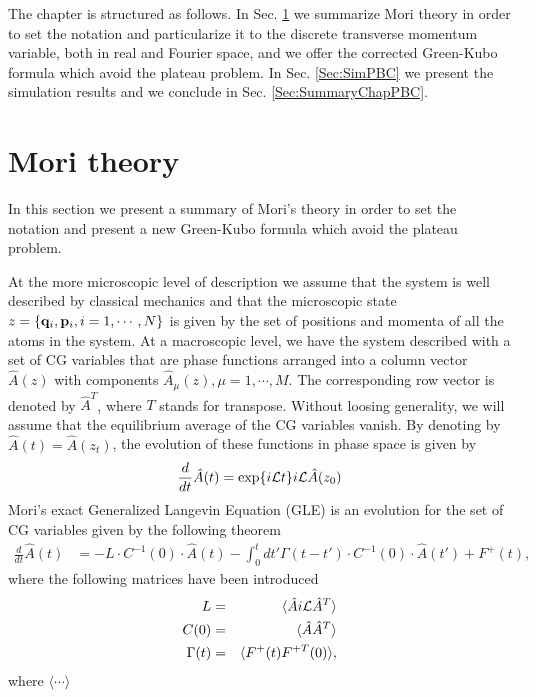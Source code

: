 \documentclass[b5paper,openright,11pt]{book}
\newcommand{\esc}{\!\cdot\!}
\begin{document}
The chapter is structured as follows. In Sec. \ref{Sec:Mori} we summarize
Mori theory in  order to set the notation and  particularize it to the
discrete transverse momentum variable, both in real and Fourier space, and we offer the corrected Green-Kubo formula which avoid the plateau problem.
In Sec. \ref{Sec:SimPBC} we present the simulation results and we conclude
in Sec. \ref{Sec:SummaryChapPBC}.


\section{Mori theory}
\label{Sec:Mori}
In this section we present a summary of Mori's theory in order to
set the notation and present a new Green-Kubo formula which avoid the plateau problem. 


At the more microscopic level of description we assume that the system is  well described  by classical  mechanics and  that the  microscopic state $z=\{{\bf q}_i,{\bf p}_i,i=1,\cdots,N\}$  is given by the set of positions  and momenta  of all  the atoms  in the  system.
At a macroscopic  level, we have  the system described with a  set of CG variables  that are phase functions arranged  into a column vector  $\hat{A}(z)$ with components $\hat{A}_\mu(z),\mu=1,\cdots,M$.   
The  corresponding  row  vector  is denoted  by  $\hat{A}^T$, where  $T$  stands  for transpose.   
Without loosing generality, we will assume that the equilibrium average of the CG variables  vanish.  
By  denoting by  $\hat{A}(t)=\hat{A}(z_t)$, the evolution of these functions in phase space is given by
\begin{eqnarray}
\frac{d}{dt}{\hat{A}}(t)=\exp\{i{\cal L}t\}i{\cal L}\hat{A}(z_0)
\label{LA}
\end{eqnarray}
Mori's  exact  Generalized Langevin  Equation  (GLE)  is an  evolution for the set of CG variables given by the following theorem
\begin{align}
\frac{d}{dt}\hat{A}(t) &= -L\esc C^{-1}(0)\esc \hat{A} (t)
-\int_0^tdt'\Gamma(t-t')\esc  C^{-1}(0)\esc \hat{A} (t') +F^+(t),
\label{exact}
\end{align}
where the following matrices have been introduced
\begin{eqnarray}
L&=&\langle \hat{A}i{\cal L}\hat{A}^T\rangle
\nonumber\\
C(0)&=&\langle \hat{A}\hat{A}^T\rangle
\nonumber\\
\Gamma(t)&=&\langle F^+(t)F^{+T}(0)\rangle,
\label{def}
\end{eqnarray}
where  $\langle\cdots \rangle$
\end{document}
